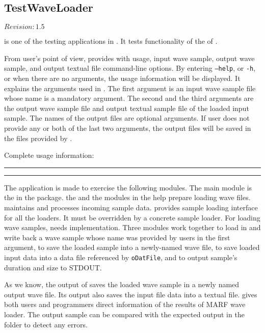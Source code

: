 \subsection{TestWaveLoader}

$Revision: 1.5 $

 is one of the testing applications in {\marf}. It tests functionality of
the  of {\marf}.

From user's point of view,  provides with usage, input wave sample, output wave
sample, and output textual file command-line options.
By entering \texttt{--help}, or \texttt{-h}, or
when there are no arguments, the usage information will be displayed.
It explains the arguments used in . The first argument is an input wave sample file whose name is a mandatory argument.
The second and the third arguments are the output wave sample file and output textual sample file of the loaded input sample. The names of the output
files are optional arguments. If user does not provide any or both of the last two arguments, the output files will be saved in the files provided by 
.

\noindent
Complete usage information:

\vspace{15pt}
\hrule

\hrule
\vspace{15pt}

The application is made to exercise the following {\marf} modules.
The main module is the  in the  package.
the  and the  modules in the  help  prepare loading wave files.
 maintains and processes incoming sample data.  provides sample loading interface for
all the {\marf} loaders. It must be overridden by a concrete sample loader. 
For loading wave samples,  needs  implementation.
Three modules work together to load in and write back a wave sample whose name was
provided by users in the first argument, to save the loaded sample into a newly-named wave file,
to save loaded input data into a data file referenced by \texttt{oDatFile}, 
and to output sample's duration and size to STDOUT.

As we know, the output of  saves the loaded wave sample in a newly named output wave file.
Its output also saves the input file data into a textual file.
 gives both users and programmers direct information of the results of MARF wave loader.
The output sample can be compared with the expected output in the  folder to detect any errors.

